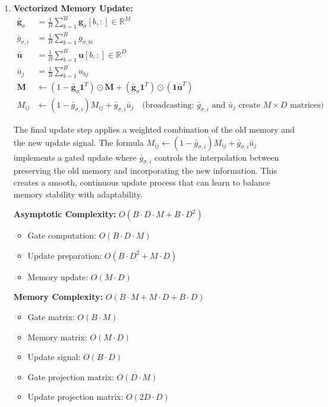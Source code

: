 \documentclass{article}
\begin{document}
\begin{enumerate}
The update preparation creates a context-dependent update signal by combining the current representative with the average memory state. The concatenation $[\mathbf{r}, \bar{\mathbf{m}}]$ allows the model to learn different update strategies based on both the current input and the existing memory context. This enables the system to adapt its memory updates based on what it already knows, creating a more sophisticated learning mechanism than simple input-based updates.

\item \textbf{Vectorized Memory Update:}
\begin{align}
\bar{\mathbf{g}}_\sigma &= \frac{1}{B}\sum_{b=1}^{B} \mathbf{g}_\sigma[b, :] \in \mathbb{R}^{M} \\
\bar{g}_{\sigma,i} &= \frac{1}{B}\sum_{b=1}^{B} g_{\sigma,bi} \\
\bar{\mathbf{u}} &= \frac{1}{B}\sum_{b=1}^{B} \mathbf{u}[b, :] \in \mathbb{R}^{D} \\
\bar{u}_j &= \frac{1}{B}\sum_{b=1}^{B} u_{bj} \\
\mathbf{M} &\leftarrow (1 - \bar{\mathbf{g}}_\sigma \mathbf{1}^T) \odot \mathbf{M} + (\bar{\mathbf{g}}_\sigma \mathbf{1}^T) \odot (\mathbf{1} \bar{\mathbf{u}}^T) \\
M_{ij} &\leftarrow (1 - \bar{g}_{\sigma,i}) M_{ij} + \bar{g}_{\sigma,i} \bar{u}_j \quad \text{(broadcasting: $\bar{g}_{\sigma,i}$ and $\bar{u}_j$ create $M \times D$ matrices)}
\end{align}

The final update step applies a weighted combination of the old memory and the new update signal. The formula $M_{ij} \leftarrow (1 - \bar{g}_{\sigma,i}) M_{ij} + \bar{g}_{\sigma,i} \bar{u}_j$ implements a gated update where $\bar{g}_{\sigma,i}$ controls the interpolation between preserving the old memory and incorporating the new information. This creates a smooth, continuous update process that can learn to balance memory stability with adaptability.

\textbf{Asymptotic Complexity:} $O(B \cdot D \cdot M + B \cdot D^2)$
\begin{itemize}
\item Gate computation: $O(B \cdot D \cdot M)$
\item Update preparation: $O(B \cdot D^2 + M \cdot D)$
\item Memory update: $O(M \cdot D)$
\end{itemize}

\textbf{Memory Complexity:} $O(B \cdot M + M \cdot D + B \cdot D)$
\begin{itemize}
\item Gate matrix: $O(B \cdot M)$
\item Memory matrix: $O(M \cdot D)$
\item Update signal: $O(B \cdot D)$
\item Gate projection matrix: $O(D \cdot M)$
\item Update projection matrix: $O(2D \cdot D)$
\end{itemize}
\end{enumerate}
\end{document}
